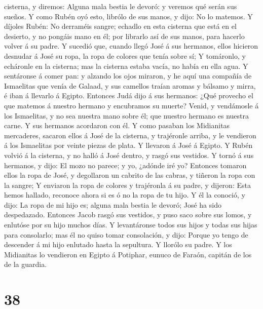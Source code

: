 cisterna, y diremos: Alguna mala bestia le devoró: y veremos qué serán
sus sueños.  Y como Rubén oyó esto, librólo de sus manos, y
dijo: No lo matemos.  Y díjoles Rubén: No derraméis sangre;
echadlo en esta cisterna que está en el desierto, y no pongáis mano en
él; por librarlo así de sus manos, para hacerlo volver á su padre.
 Y sucedió que, cuando llegó José á sus hermanos, ellos
hicieron desnudar á José su ropa, la ropa de colores que tenía sobre sí;
 Y tomáronlo, y echáronle en la cisterna; mas la cisterna
estaba vacía, no había en ella agua.  Y sentáronse á comer
pan: y alzando los ojos miraron, y he aquí una compañía de Ismaelitas
que venía de Galaad, y sus camellos traían aromas y bálsamo y mirra, é
iban á llevarlo á Egipto.  Entonces Judá dijo á sus
hermanos: ¿Qué provecho el que matemos á nuestro hermano y encubramos su
muerte?  Venid, y vendámosle á los Ismaelitas, y no sea
nuestra mano sobre él; que nuestro hermano es nuestra carne. Y sus
hermanos acordaron con él.  Y como pasaban los Midianitas
mercaderes, sacaron ellos á José de la cisterna, y trajéronle arriba, y
le vendieron á los Ismaelitas por veinte piezas de plata. Y llevaron á
José á Egipto.  Y Rubén volvió á la cisterna, y no halló á
José dentro, y rasgó sus vestidos.  Y tornó á sus hermanos,
y dijo: El mozo no parece; y yo, ¿adónde iré yo?  Entonces
tomaron ellos la ropa de José, y degollaron un cabrito de las cabras, y
tiñeron la ropa con la sangre;  Y enviaron la ropa de
colores y trajéronla á su padre, y dijeron: Esta hemos hallado, reconoce
ahora si es ó no la ropa de tu hijo.  Y él la conoció, y
dijo: La ropa de mi hijo es; alguna mala bestia le devoró; José ha sido
despedazado.  Entonces Jacob rasgó sus vestidos, y puso
saco sobre sus lomos, y enlutóse por su hijo muchos días. 
Y levantáronse todos sus hijos y todas sus hijas para consolarlo; mas él
no quiso tomar consolación, y dijo: Porque yo tengo de descender á mi
hijo enlutado hasta la sepultura. Y llorólo su padre.  Y
los Midianitas lo vendieron en Egipto á Potiphar, eunuco de Faraón,
capitán de los de la guardia.

\hypertarget{section-37}{%
\section{38}\label{section-37}}


